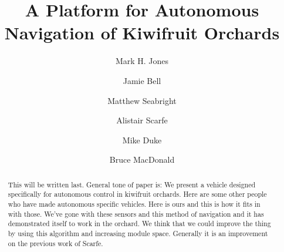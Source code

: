 \documentclass[preprint,authoryear,12pt]{elsarticle}
\begin{document}
\begin{frontmatter}



\title{A Platform for Autonomous Navigation of Kiwifruit Orchards}



\author[UoW]{Mark H. Jones}

\author[UoA]{Jamie Bell}
\author[UoW]{Matthew Seabright}
\author[RPL]{Alistair Scarfe}
\author[UoW]{Mike Duke}
\author[UoA]{Bruce MacDonald}

\address[UoW]{School of Engineering, University of Waikato, Hamilton, New Zealand}
\address[UoA]{Faculty of Engineering, University of Auckland, Auckland, New Zealand}
\address[RPL]{Robotics Plus Ltd, Newnham Innovation Park, Tauranga, New Zealand}

\begin{abstract}

    This will be written last.
    General tone of paper is:
    We present a vehicle designed specifically for autonomous control in kiwifruit orchards.
    Here are some other people who have made autonomous specific vehicles.
    Here is ours and this is how it fits in with those.
    We've gone with these sensors and this method of navigation and it has demonstrated itself to work in the orchard.
    We think that we could improve the thing by using this algorithm and increasing module space.
    Generally it is an improvement on the previous work of Scarfe.
\end{abstract}


\end{frontmatter}
\end{document}
